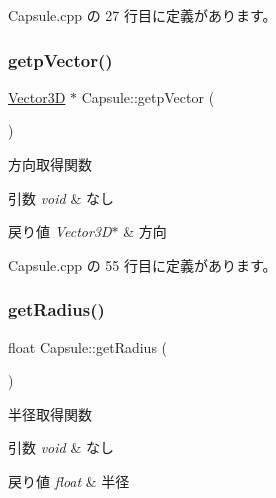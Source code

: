  Capsule.\+cpp の 27 行目に定義があります。

\mbox{\label{class_capsule_a93bb5298cb7f9f8ab27e08825bcb2f76}} 
\subsubsection{\texorpdfstring{getp\+Vector()}{getpVector()}}
{\footnotesize\ttfamily \mbox{\hyperlink{class_vector3_d}{Vector3D}} $\ast$ Capsule\+::getp\+Vector (\begin{DoxyParamCaption}{ }\end{DoxyParamCaption})}



方向取得関数 


\begin{DoxyParams}{引数}
{\em void} & なし \\
\hline
\end{DoxyParams}

\begin{DoxyRetVals}{戻り値}
{\em Vector3\+D$\ast$} & 方向 \\
\hline
\end{DoxyRetVals}


 Capsule.\+cpp の 55 行目に定義があります。

\mbox{\label{class_capsule_a4e98e8545ea57fe682c5a2002bd49bdb}} 
\subsubsection{\texorpdfstring{get\+Radius()}{getRadius()}}
{\footnotesize\ttfamily float Capsule\+::get\+Radius (\begin{DoxyParamCaption}{ }\end{DoxyParamCaption})}



半径取得関数 


\begin{DoxyParams}{引数}
{\em void} & なし \\
\hline
\end{DoxyParams}

\begin{DoxyRetVals}{戻り値}
{\em float} & 半径 \\
\hline
\end{DoxyRetVals}


